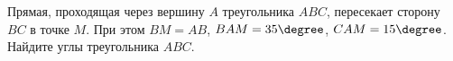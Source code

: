 \begin{ex}
	\begin{condition}
		Прямая, проходящая через вершину \( A  \) треугольника \( ABC \), пересекает сторону \( BC  \) в точке \( M  \). При этом \( BM = AB \), \( BAM = 35\degree \), \( CAM = 15\degree \). Найдите углы треугольника \( ABC \).
	\end{condition}
	\answer{\( 50\degree, 110\degree, 20\degree\)}
\end{ex}
